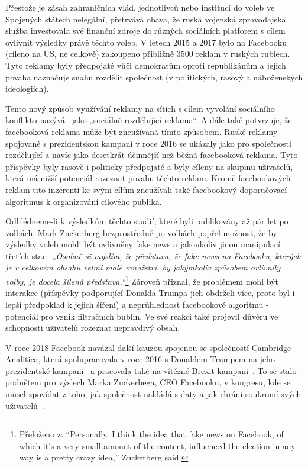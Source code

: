     Přestože je zásah zahraničních vlád, jednotlivců nebo institucí do voleb ve Spojených státech nelegální, přetrvává obava, že ruská vojenská zpravodajská služba investovala své finanční zdroje do různých sociálních platforem s cílem ovlivnit výsledky právě těchto voleb. V letech 2015 a 2017 bylo na Facebooku (cíleno na US, ne celkově) zakoupeno přibližně 3500 reklam v ruských rublech. Tyto reklamy byly předpojaté vůči demokratům oproti republikánům a jejich povaha naznačuje snahu rozdělit společnost (v politických, rasový a náboženských ideologiích).~\citep{dutt2018senator} 
    
    \setlength\parskip{0mm}
    
    Tento nový způsob využívání reklamy na sítích s cílem vyvolání sociálního konfliktu nazývá~\cite{ribeiro2019microtargeting} jako „sociálně rozdělující reklama“. A dále také potvrzuje, že facebooková reklama může být zneužívaná tímto způsobem. Ruské reklamy spojované s prezidentskou kampaní v roce 2016 se ukázaly jako pro společnosti rozdělující a navíc jako desetkrát účinnější než běžná facebooková reklama. Tyto příspěvky byly rasově i politicky předpojaté a byly cíleny na skupinu uživatelů, která má nižší potenciál rozeznat povahu těchto reklam. Kromě facebookových reklam tito inzerenti ke svým cílům zneužívali také facebookový doporučovací algoritmus k organizování cílového publika.
    
    Odhlédneme-li k výsledkům těchto studií, které byli publikovány až pár let po volbách, Mark Zuckerberg bezprostředně po volbách popřel možnost, že by výsledky voleb mohli být ovlivněny fake news a jakoukoliv jinou manipulací třetích stan. \textit{„Osobně si myslím, že představa, že fake news na Facebooku, kterých je v celkovém obsahu velmi malé množství, by jakýmkoliv způsobem ovlivnily volby, je docela šílená představa.“}\footnote{Přeloženo z: “Personally, I think the idea that fake news on Facebook, of which it’s a very small amount of the content, influenced the election in any way is a pretty crazy idea,” Zuckerberg said.} Zároveň přiznal, že problémem mohl být interakce (příspěvky podporující Donalda Trumpa jich obdrželi více, proto byl i lepší předpoklad k jejich šíření) a neprůhlednost facebookové algoritmu - potenciál pro vznik filtračních bublin. Ve své reakci také projevil důvěru ve schopnosti uživatelů rozeznat nepravdivý obsah.~\citep{mannes_2016}
    
    V roce 2018 Facebook navázal další kauzou spojenou se společností Cambridge Analitica, která spolupracovala v roce 2016 s Donaldem Trumpem na jeho prezidentské kampani~\citep{andrewgreiner_fiegerman_sherman_baker_2019} a pracovala také na vítězné Brexit kampani~\citep{cadwalladr_graham-harrison_2018}. To se stalo podnětem pro výslech Marka Zuckerbega, CEO Facebooku, v kongresu, kde se musel zpovídat z toho, jak společnost nakládá s daty a jak chrání soukromí svých uživatelů~\citep{andrewgreiner_fiegerman_sherman_baker_2019}.
    

